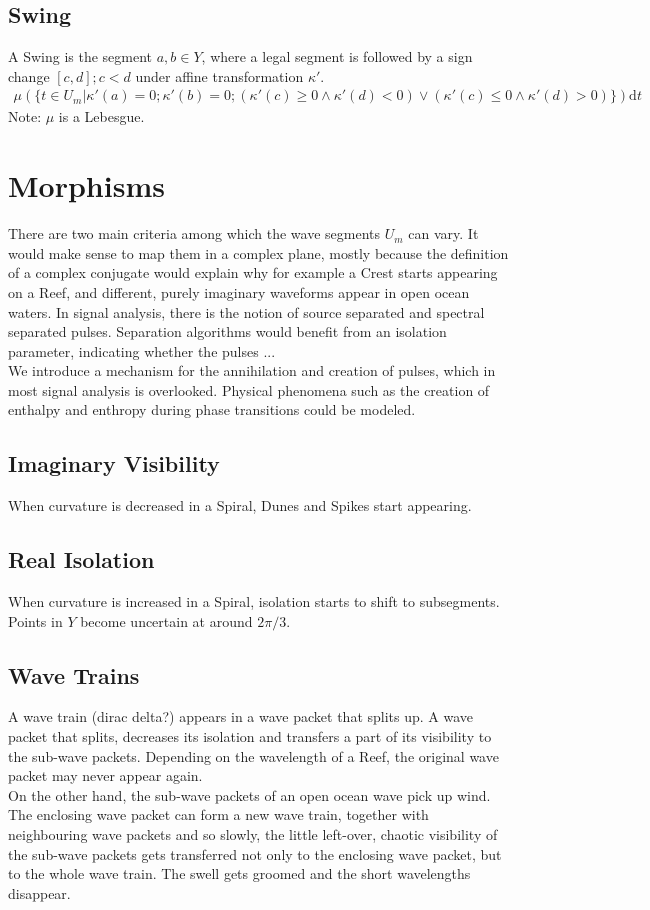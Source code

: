 \documentclass{article}
\begin{document}
\subsection{Swing}
A Swing is the segment $a,b \in Y$, where a legal segment is followed by a sign change $[c,d]; c<d$ under affine transformation $\kappa'$.
\begin{align}
\mu(\{t \in U_{m} \vert \kappa'(a)=0;\kappa'(b)=0;(\kappa'(c)\geq 0 \land \kappa'(d)<0) \lor (\kappa'(c)\leq 0 \land \kappa'(d)>0) \}) \mathrm{d}t
\end{align}
Note: $\mu$ is a Lebesgue.

\section{Morphisms}
There are two main criteria among which the wave segments $U_{m}$ can vary. It would make sense to map them in a complex plane, mostly because the definition of a complex conjugate would explain why for example a Crest starts appearing on a Reef, and different, purely imaginary waveforms appear in open ocean waters. In signal analysis, there is the notion of source separated and spectral separated pulses. Separation algorithms would benefit from an isolation parameter, indicating whether the pulses ...\\
We introduce a mechanism for the annihilation and creation of pulses, which in most signal analysis is overlooked. Physical phenomena such as the creation of enthalpy and enthropy during phase transitions could be modeled.

\subsection{Imaginary Visibility}
When curvature is decreased in a Spiral, Dunes and Spikes start appearing.

\subsection{Real Isolation}
When curvature is increased in a Spiral, isolation starts to shift to subsegments. Points in $Y$ become uncertain at around $2\pi/3$.

\subsection{Wave Trains}
A wave train (dirac delta?) appears in a wave packet that splits up. A wave packet that splits, decreases its isolation and transfers a part of its visibility to the sub-wave packets. Depending on the wavelength of a Reef, the original wave packet may never appear again.\\
On the other hand, the sub-wave packets of an open ocean wave pick up wind. The enclosing wave packet can form a new wave train, together with neighbouring wave packets and so slowly, the little left-over, chaotic visibility of the sub-wave packets gets transferred not only to the enclosing wave packet, but to the whole wave train. The swell gets groomed and the short wavelengths disappear.

\printbibliography
\end{document}

